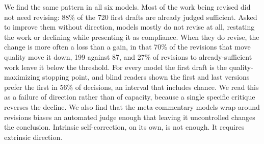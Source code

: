 We find the same pattern in all six models. Most of the work being revised did not need
revising: 88\% of the 720 first drafts are already judged sufficient. Asked to improve
them without direction, models mostly do not revise at all, restating the work or
declining while presenting it as compliance. When they do revise, the change is more often
a loss than a gain, in that 70\% of the revisions that move quality move it down, 199
against 87, and 27\% of revisions to already-sufficient work leave it below the threshold.
For every model the first draft is the quality-maximizing stopping point, and blind readers
shown the first and last versions prefer the first in 56\% of decisions, an interval that
includes chance. We read this as a failure of direction rather than of capacity, because a
single specific critique reverses the decline. We also find that the meta-commentary models
wrap around revisions biases an automated judge enough that leaving it uncontrolled changes
the conclusion. Intrinsic self-correction, on its own, is not enough. It requires extrinsic
direction.
